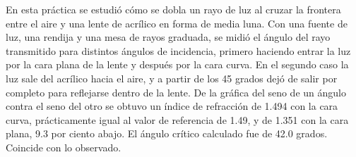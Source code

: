 En esta práctica se estudió cómo se dobla un rayo de luz al cruzar la frontera entre el aire y una lente de acrílico en forma de media luna. Con una fuente de luz, una rendija y una mesa de rayos graduada, se midió el ángulo del rayo transmitido para distintos ángulos de incidencia, primero haciendo entrar la luz por la cara plana de la lente y después por la cara curva. En el segundo caso la luz sale del acrílico hacia el aire, y a partir de los 45 grados dejó de salir por completo para reflejarse dentro de la lente. De la gráfica del seno de un ángulo contra el seno del otro se obtuvo un índice de refracción de 1.494 con la cara curva, prácticamente igual al valor de referencia de 1.49, y de 1.351 con la cara plana, 9.3 por ciento abajo. El ángulo crítico calculado fue de 42.0 grados. Coincide con lo observado.
